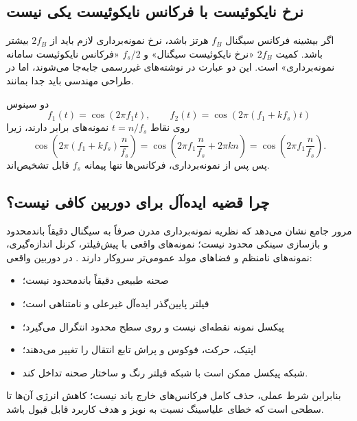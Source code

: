 \subsection{نرخ نایکوئیست با فرکانس نایکوئیست یکی نیست}

اگر بیشینه فرکانس سیگنال \(f_B\) هرتز باشد، نرخ نمونه‌برداری لازم باید از \(2f_B\) بیشتر باشد.
کمیت \(2f_B\) «نرخ نایکوئیست سیگنال» و \(f_s/2\) «فرکانس نایکوئیست سامانه نمونه‌برداری» است.
این دو عبارت در نوشته‌های غیررسمی جابه‌جا می‌شوند، اما در طراحی مهندسی باید جدا بمانند.

\begin{example}
دو سینوس
\begin{equation}
f_1(t)=\cos(2\pi f_1t),\qquad
f_2(t)=\cos(2\pi(f_1+kf_s)t)
\end{equation}
روی نقاط \(t=n/f_s\) نمونه‌های برابر دارند، زیرا
\begin{equation}
\cos\!\left(2\pi(f_1+kf_s)\frac{n}{f_s}\right)
=\cos\!\left(2\pi f_1\frac{n}{f_s}+2\pi kn\right)
=\cos\!\left(2\pi f_1\frac{n}{f_s}\right).
\end{equation}
پس پس از نمونه‌برداری، فرکانس‌ها تنها پیمانه \(f_s\) قابل تشخیص‌اند.
\end{example}

\subsection{چرا قضیه ایده‌آل برای دوربین کافی نیست؟}

مرور جامع  نشان می‌دهد که نظریه نمونه‌برداری مدرن صرفاً به سیگنال دقیقاً باند‌محدود
و بازسازی سینکی محدود نیست؛ نمونه‌های واقعی با پیش‌فیلتر، کرنل اندازه‌گیری، نمونه‌های نامنظم
و فضاهای مولد عمومی‌تر سروکار دارند \cite{unser2000sampling,papoulis1977generalized,unser2000generalized}.
در دوربین واقعی:
\begin{itemize}
\item صحنه طبیعی دقیقاً باند‌محدود نیست؛
\item فیلتر پایین‌گذر ایده‌آل غیرعلی و نامتناهی است؛
\item پیکسل نمونه نقطه‌ای نیست و روی سطح محدود انتگرال می‌گیرد؛
\item اپتیک، حرکت، فوکوس و پراش تابع انتقال را تغییر می‌دهند؛
\item شبکه پیکسل ممکن است با شبکه فیلتر رنگ و ساختار صحنه تداخل کند.
\end{itemize}
بنابراین شرط عملی، حذف کامل فرکانس‌های خارج باند نیست؛ کاهش انرژی آن‌ها تا سطحی است که
خطای علیاسینگ نسبت به نویز و هدف کاربرد قابل قبول باشد.

